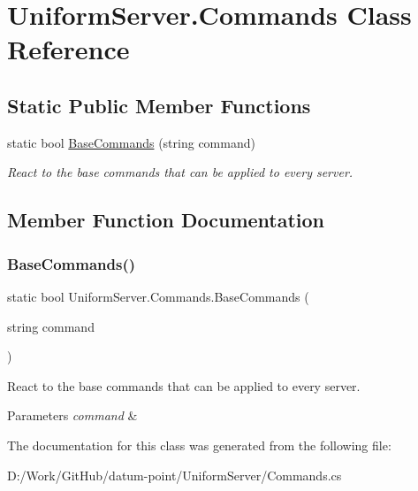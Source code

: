 \hypertarget{class_uniform_server_1_1_commands}{}\section{Uniform\+Server.\+Commands Class Reference}
\label{class_uniform_server_1_1_commands}
\subsection*{Static Public Member Functions}
\begin{DoxyCompactItemize}
\item 
static bool \mbox{\hyperlink{class_uniform_server_1_1_commands_ad1bac97da40d03e97f9b5fe7ed152ef9}{Base\+Commands}} (string command)
\begin{DoxyCompactList}\small\item\em React to the base commands that can be applied to every server. \end{DoxyCompactList}\end{DoxyCompactItemize}


\subsection{Member Function Documentation}
\mbox{\label{class_uniform_server_1_1_commands_ad1bac97da40d03e97f9b5fe7ed152ef9}} 
\subsubsection{\texorpdfstring{Base\+Commands()}{BaseCommands()}}
{\footnotesize\ttfamily static bool Uniform\+Server.\+Commands.\+Base\+Commands (\begin{DoxyParamCaption}\item[{string}]{command }\end{DoxyParamCaption})\hspace{0.3cm}{\ttfamily [static]}}



React to the base commands that can be applied to every server. 


\begin{DoxyParams}{Parameters}
{\em command} & \\
\hline
\end{DoxyParams}


The documentation for this class was generated from the following file\+:\begin{DoxyCompactItemize}
\item 
D\+:/\+Work/\+Git\+Hub/datum-\/point/\+Uniform\+Server/Commands.\+cs\end{DoxyCompactItemize}
